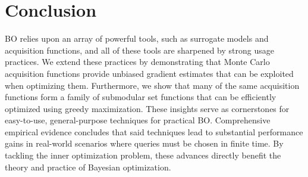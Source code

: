 
\section{Conclusion}
\label{sect:conclusion}

BO relies upon an array of powerful tools, such as surrogate models and acquisition functions, and all of these tools are sharpened by strong usage practices. 
% 
We extend these practices by demonstrating that Monte Carlo acquisition functions provide unbiased gradient estimates that can be exploited when optimizing them.
% 
Furthermore, we show that many of the same acquisition functions form a family of submodular set functions that can be efficiently optimized using greedy maximization.
%
These insights serve as cornerstones for easy-to-use, general-purpose techniques for practical BO.
% 
Comprehensive empirical evidence concludes that said techniques lead to substantial performance gains in real-world scenarios where queries must be chosen in finite time. 
% 
By tackling the inner optimization problem, these advances directly benefit the theory and practice of Bayesian optimization.